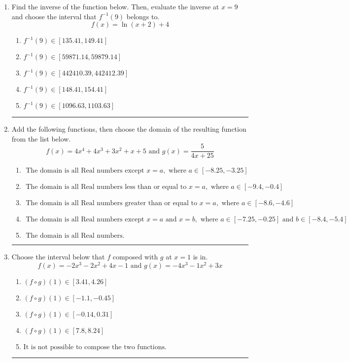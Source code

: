 \documentclass[14pt]{extbook}
\newcommand{\litem}[1]{\item#1\hspace*{-1cm}\rule{\textwidth}{0.4pt}}
\begin{document}
\begin{enumerate}
\litem{
Find the inverse of the function below. Then, evaluate the inverse at $x = 9$ and choose the interval that $f^{-1}(9)$ belongs to.\[ f(x) = \ln{(x+2)}+4 \]\begin{enumerate}[label=\Alph*.]
\item \( f^{-1}(9) \in [135.41, 149.41] \)
\item \( f^{-1}(9) \in [59871.14, 59879.14] \)
\item \( f^{-1}(9) \in [442410.39, 442412.39] \)
\item \( f^{-1}(9) \in [148.41, 154.41] \)
\item \( f^{-1}(9) \in [1096.63, 1103.63] \)

\end{enumerate} }
\litem{
Add the following functions, then choose the domain of the resulting function from the list below.\[ f(x) = 4x^{4} +4 x^{3} +3 x^{2} +x + 5 \text{ and } g(x) = \frac{5}{4x+25} \]\begin{enumerate}[label=\Alph*.]
\item \( \text{ The domain is all Real numbers except } x = a, \text{ where } a \in [-8.25, -3.25] \)
\item \( \text{ The domain is all Real numbers less than or equal to } x = a, \text{ where } a \in [-9.4, -0.4] \)
\item \( \text{ The domain is all Real numbers greater than or equal to } x = a, \text{ where } a \in [-8.6, -4.6] \)
\item \( \text{ The domain is all Real numbers except } x = a \text{ and } x = b, \text{ where } a \in [-7.25, -0.25] \text{ and } b \in [-8.4, -5.4] \)
\item \( \text{ The domain is all Real numbers. } \)

\end{enumerate} }
\litem{
Choose the interval below that $f$ composed with $g$ at $x=1$ is in.\[ f(x) = -2x^{3} -2 x^{2} +4 x -1 \text{ and } g(x) = -4x^{3} -1 x^{2} +3 x \]\begin{enumerate}[label=\Alph*.]
\item \( (f \circ g)(1) \in [3.41, 4.26] \)
\item \( (f \circ g)(1) \in [-1.1, -0.45] \)
\item \( (f \circ g)(1) \in [-0.14, 0.31] \)
\item \( (f \circ g)(1) \in [7.8, 8.24] \)
\item \( \text{It is not possible to compose the two functions.} \)


\end{enumerate}}
\end{enumerate}
\end{document}
